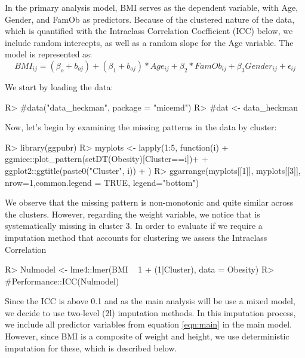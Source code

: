 \documentclass[
]{jss}
\begin{document}
In the primary analysis model, BMI serves as the dependent variable,
with Age, Gender, and FamOb as predictors. Because of the clustered
nature of the data, which is quantified with the Intraclass Correlation
Coefficient (ICC) below, we include random intercepts, as well as a
random slope for the Age variable. The model is represented as:
\begin{equation}
\label{eqn:main}
BMI_{ij}= (\beta_{o}+ b_{oj} ) + (\beta_{1}+ b_{oj})* Age_{ij} + \beta_{2}*FamOb_{ij}+ \beta_{3}Gender_{ij} + \epsilon_{ij}
\end{equation}

We start by loading the data:

\begin{CodeChunk}
\begin{CodeInput}
R> #data("data_heckman", package = "micemd")
R> #dat <- data_heckman
\end{CodeInput}
\end{CodeChunk}

Now, let's begin by examining the missing patterns in the data by
cluster:

\begin{CodeChunk}
\begin{CodeInput}
R> library(ggpubr)
R> myplots <- lapply(1:5, function(i) {
+   ggmice::plot_pattern(setDT(Obesity)[Cluster==i])+
+   ggplot2::ggtitle(paste0("Cluster", i))
+  })
R> ggarrange(myplots[[1]], myplots[[3]], nrow=1,common.legend = TRUE, legend="bottom")
\end{CodeInput}
\end{CodeChunk}

We observe that the missing pattern is non-monotonic and quite similar
across the clusters. However, regarding the weight variable, we notice
that is systematically missing in cluster 3. In order to evaluate if we
require a imputation method that accounts for clustering we assess the
Intraclass Correlation

\begin{CodeChunk}
\begin{CodeInput}
R> Nulmodel <- lme4::lmer(BMI ~ 1 + (1|Cluster), data = Obesity)
R> #Performance::ICC(Nulmodel)
\end{CodeInput}
\end{CodeChunk}

Since the ICC is above 0.1 and as the main analysis will be use a mixed
model, we decide to use two-level (2l) imputation methods. In this
imputation process, we include all predictor variables from equation
\ref{eqn:main} in the main model. However, since BMI is a composite of
weight and height, we use deterministic imputation for these, which is
described below.
\end{document}
